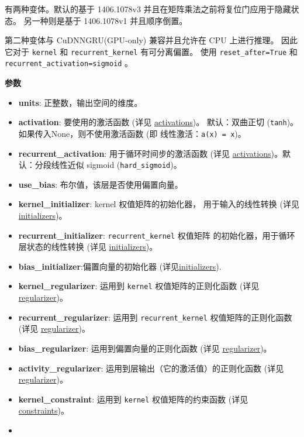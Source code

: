有两种变体。默认的基于 1406.1078v3
并且在矩阵乘法之前将复位门应用于隐藏状态。 另一种则是基于 1406.1078v1
并且顺序倒置。

第二种变体与 CuDNNGRU(GPU-only) 兼容并且允许在 CPU 上进行推理。
因此它对于 \texttt{kernel} 和 \texttt{recurrent\_kernel} 有可分离偏置。
使用 \texttt{\textquotesingle{}reset\_after\textquotesingle{}=True} 和
\texttt{recurrent\_activation=\textquotesingle{}sigmoid\textquotesingle{}}
。


\textbf{参数}

\begin{itemize}
\tightlist
\item
  \textbf{units}: 正整数，输出空间的维度。
\item
  \textbf{activation}: 要使用的激活函数 (详见
  \hyperref[activations]{activations})。 默认：双曲正切
  (\texttt{tanh})。如果传入None，则不使用激活函数 (即 线性激活：\texttt{a(x)\ =\ x})。
\item
  \textbf{recurrent\_activation}: 用于循环时间步的激活函数 (详见
  \hyperref[activations]{activations})。默认：分段线性近似 sigmoid (\texttt{hard\_sigmoid})。
\item
  \textbf{use\_bias}: 布尔值，该层是否使用偏置向量。
\item
  \textbf{kernel\_initializer}: kernel 权值矩阵的初始化器，
  用于输入的线性转换 (详见 \hyperref[initializers]{initializers})。
\item
  \textbf{recurrent\_initializer}: \texttt{recurrent\_kernel} 权值矩阵
  的初始化器，用于循环层状态的线性转换 (详见
  \hyperref[initializers]{initializers})。
\item
  \textbf{bias\_initializer}:偏置向量的初始化器
  (详见\hyperref[initializers]{initializers}).
\item
  \textbf{kernel\_regularizer}: 运用到 \texttt{kernel}
  权值矩阵的正则化函数 (详见 \hyperref[regularizers]{regularizer})。
\item
  \textbf{recurrent\_regularizer}: 运用到 \texttt{recurrent\_kernel}
  权值矩阵的正则化函数 (详见 \hyperref[regularizers]{regularizer})。
\item
  \textbf{bias\_regularizer}: 运用到偏置向量的正则化函数 (详见
  \hyperref[regularizers]{regularizer})。
\item
  \textbf{activity\_regularizer}: 运用到层输出（它的激活值）的正则化函数
  (详见 \hyperref[regularizers]{regularizer})。
\item
  \textbf{kernel\_constraint}: 运用到 \texttt{kernel} 权值矩阵的约束函数
  (详见 \hyperref[constraints]{constraints})。
\item

\end{itemize}

